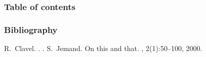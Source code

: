 




%
\frame{\titlepage}
%
\begin{frame}
\frametitle{Table of contents}
\begin{multicols}{2}
\tableofcontents
\end{multicols}
\end{frame}


%

%

%
\begin{frame}[allowframebreaks]
  \frametitle<presentation>{Bibliography}
  \begin{thebibliography}{10}
  \beamertemplatearticlebibitems
    R.~Clavel.
    .
    .
  \beamertemplatearticlebibitems
    S.~Jemand.
    \newblock On this and that.
    , 2(1):50--100, 2000.
  \end{thebibliography}
\end{frame}

